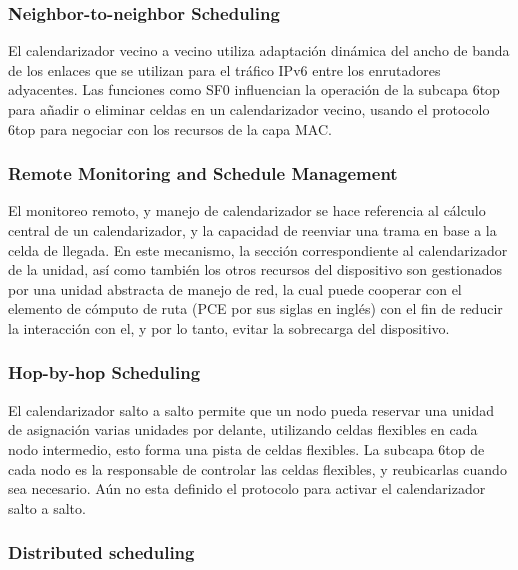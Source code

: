 \subsubsection{Neighbor-to-neighbor Scheduling}

El calendarizador vecino a vecino utiliza adaptación dinámica del ancho de banda de los enlaces que se utilizan para el tráfico IPv6 entre los enrutadores adyacentes. Las funciones como SF0 influencian la operación de la subcapa 6top para añadir o eliminar celdas en un calendarizador vecino, usando el protocolo 6top para negociar con los recursos de la capa MAC.

\subsubsection{Remote Monitoring and Schedule Management}

El monitoreo remoto, y manejo de calendarizador se hace referencia al cálculo central de un calendarizador, y la capacidad de reenviar una trama en base a la celda de llegada. En este mecanismo, la sección correspondiente al calendarizador de la unidad, así como también los otros recursos del dispositivo son gestionados por una unidad abstracta de manejo de red, la cual puede cooperar con el elemento de cómputo de ruta (PCE por sus siglas en inglés) con el fin de reducir la interacción con el, y por lo tanto, evitar la sobrecarga del dispositivo.

\subsubsection{Hop-by-hop Scheduling}

El calendarizador salto a salto permite que un nodo pueda reservar una unidad de asignación varias unidades por delante, utilizando celdas flexibles en cada nodo intermedio, esto forma una pista de celdas flexibles. La subcapa 6top de cada nodo es la responsable de controlar las celdas flexibles, y reubicarlas cuando sea necesario. Aún no esta definido el protocolo para activar el calendarizador salto a salto.


\subsubsection{Distributed scheduling}

